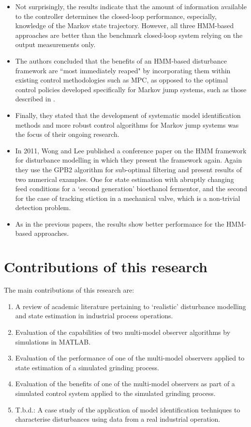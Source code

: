 \begin{itemize}
	\item Not surprisingly, the results indicate that the amount of information available to the controller determines the closed-loop performance, especially, knowledge of the Markov state trajectory. However, all three HMM-based approaches are better than the benchmark closed-loop system relying on the output measurements only.
	\item The authors concluded that the benefits of an HMM-based disturbance framework are ``most immediately reaped" by incorporating them within existing control methodologies such as MPC, as opposed to the optimal control policies developed specifically for Markov jump systems, such as those described in \cite{costa_discrete-time_2005}.
	\item Finally, they stated that the development of systematic model identification methods and more robust control algorithms for Markov jump systems was the focus of their ongoing research.
	\item In 2011, Wong and Lee published a conference paper on the HMM framework for disturbance modelling in which they present the framework again. Again they use the GPB2 algorithm for sub-optimal filtering and present results of two numerical examples. One for state estimation with abruptly changing feed conditions for a `second generation' bioethanol fermentor, and the second for the case of tracking stiction in a mechanical valve, which is a non-trivial detection problem.
	\item As in the previous papers, the results show better performance for the HMM-based approaches.
\end{itemize}


\section*{Contributions of this research}

The main contributions of this research are:

\begin{enumerate}
	\item A review of academic literature pertaining to `realistic' disturbance modelling and state estimation in industrial process operations.
	\item Evaluation of the capabilities of two multi-model observer algorithms by simulations in MATLAB.
	\item Evaluation of the performance of one of the multi-model observers applied to state estimation of a simulated grinding process.
	\item Evaluation of the benefits of one of the multi-model observers as part of a simulated control system applied to the simulated grinding process.
	\item T.b.d.: A case study of the application of model identification techniques to characterise disturbances using data from a real industrial operation.
\end{enumerate}

